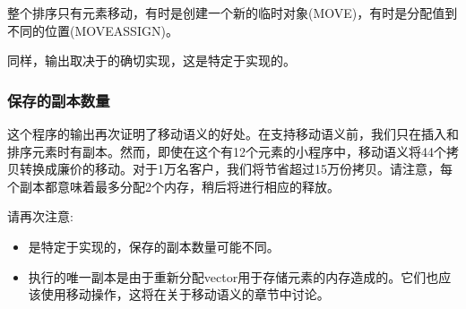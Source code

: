 整个排序只有元素移动，有时是创建一个新的临时对象(MOVE)，有时是分配值到不同的位置(MOVEASSIGN)。

同样，输出取决于的确切实现，这是特定于实现的。

\subsubsection{保存的副本数量}

这个程序的输出再次证明了移动语义的好处。在支持移动语义前，我们只在插入和排序元素时有副本。然而，即使在这个有12个元素的小程序中，移动语义将44个拷贝转换成廉价的移动。对于1万名客户，我们将节省超过15万份拷贝。请注意，每个副本都意味着最多分配2个内存，稍后将进行相应的释放。

请再次注意:

\begin{itemize}
	\item {}是特定于实现的，保存的副本数量可能不同。
	\item 执行的唯一副本是由于重新分配vector用于存储元素的内存造成的。它们也应该使用移动操作，这将在关于移动语义的章节中讨论。
\end{itemize}

























